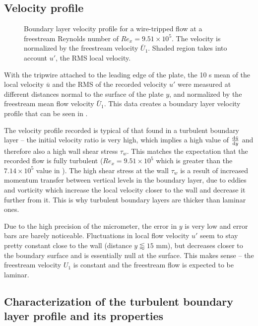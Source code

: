 \documentclass{article}
\begin{document}
\subsection{Velocity profile}
\label{sec:velocity profile}

\begin{figure}
    \centering
    
    \caption{Boundary layer velocity profile for a wire-tripped flow at a freestream Reynolds number of $Re_x=9.51\times 10^5$. The velocity is normalized by the freestream velocity $\bar{U}_1$. Shaded region takes into account $u'$, the RMS local velocity.}
    \label{fig:velocity profile}
\end{figure}

With the tripwire attached to the leading edge of the plate, the 10 \unit{\second} mean of the local velocity $\bar{u}$ and the RMS of the recorded velocity $u'$ were measured at different distances normal to the surface of the plate $y$, and normalized by the freestream mean flow velocity $\bar{U}_1$. This data creates a boundary layer velocity profile that can be seen in .

The velocity profile recorded is typical of that found in a turbulent boundary layer -- the initial velocity ratio is very high, which implies a high value of $\dv{\bar{u}}{y}$ and therefore also a high wall shear stress $\tau_w$. This matches the expectation that the recorded flow is fully turbulent ($Re_x=9.51\times 10^5$ which is greater than the $7.14 \times 10^5$ value in ). The high shear stress at the wall $\tau_w$ is a result of increased momentum transfer between vertical levels in the boundary layer, due to eddies and vorticity which increase the local velocity closer to the wall and decrease it further from it. This is why turbulent boundary layers are thicker than laminar ones.

Due to the high precision of the micrometer, the error in $y$ is very low and error bars are barely noticeable. Fluctuations in local flow velocity $u'$ seem to stay pretty constant close to the wall (distance $y \lessapprox 15$ \unit{\mm}), but decreases closer to the boundary surface and is essentially null at the surface. This makes sense -- the freestream velocity $U_1$ is constant and the freestream flow is expected to be laminar.

\subsection{Characterization of the turbulent boundary layer profile and its properties}
\end{document}
